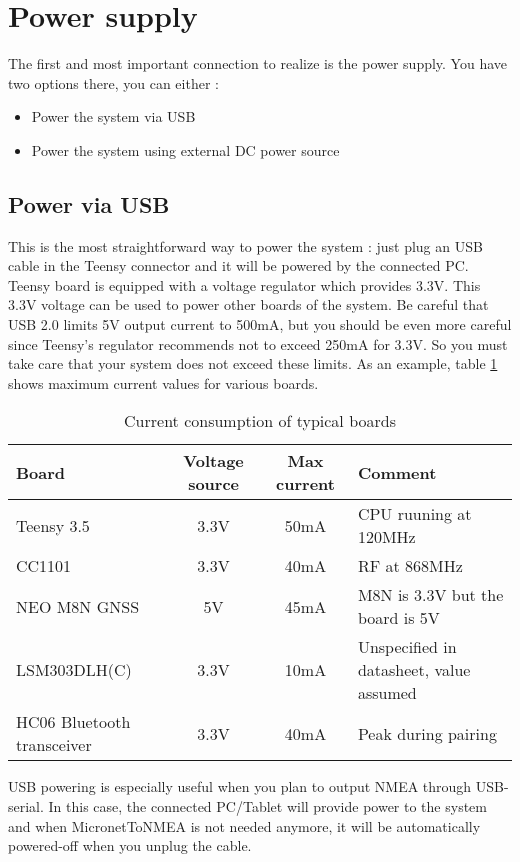 \documentclass{report}
\begin{document}
\section{Power supply}

The first and most important connection to realize is the power supply. You have two options there, you can either :

\begin{itemize}
	\item Power the system via USB
	\item Power the system using external DC power source
\end{itemize}

\subsection{Power via USB}

This is the most straightforward way to power the system : just plug an USB cable in the Teensy connector and it will be powered by the connected PC. Teensy board is equipped with a voltage regulator which provides 3.3V. This 3.3V voltage can be used to power other boards of the system.
Be careful that USB 2.0 limits 5V output current to 500mA, but you should be even more careful since Teensy's regulator recommends not to exceed 250mA for 3.3V. So you must take care that your system does not exceed these limits.
As an example, table \ref{table:boardconsumption} shows maximum current values for various boards.

\begin{table}[h]
	\begin{tabular}{|l|c|c|l|}
		\hline
		Board & Voltage source & Max current & Comment \\
		\hline
		Teensy 3.5 & 3.3V & 50mA & CPU ruuning at 120MHz\\
		CC1101 & 3.3V & 40mA & RF at 868MHz\\
		NEO M8N GNSS & 5V & 45mA & M8N is 3.3V but the board is 5V\\
		LSM303DLH(C) & 3.3V & 10mA & Unspecified in datasheet, value assumed\\
		HC06 Bluetooth transceiver & 3.3V & 40mA & Peak during pairing\\
		\hline
	\end{tabular}
	\caption{Current consumption of typical boards}
	\label{table:boardconsumption}
\end{table}
USB powering is especially useful when you plan to output NMEA through USB-serial. In this case, the connected PC/Tablet will provide power to the system and when MicronetToNMEA is not needed anymore, it will be automatically powered-off when you unplug the cable.
\end{document}

